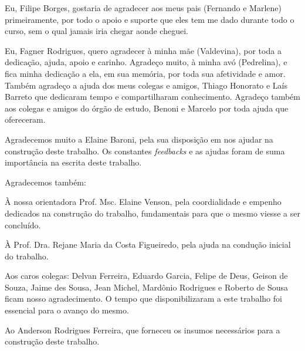 \begin{agradecimentos}
\begin{comment}
A inclusão desta seção de agradecimentos é opcional, portanto, sua inclusão 
fica a critério do(s) autor(es), que caso deseje(em) fazê-lo deverá(ão) 
utilizar este espaço, seguindo a formatação de \textit{espaço simples e 
fonte padrão do texto (arial ou times, tamanho 12 sem negritos, aspas ou 
itálico}.
\end{comment}

Eu, Filipe Borges, gostaria de agradecer aos meus pais (Fernando e Marlene) primeiramente, por todo o apoio e suporte que eles tem me dado durante todo o curso, sem o qual jamais iria chegar aonde cheguei.

Eu, Fagner Rodrigues, quero agradecer à minha mãe (Valdevina), por toda a dedicação, ajuda, apoio e carinho. Agradeço muito, à minha avó (Pedrelina), e fica minha dedicação a ela, em sua memória, por toda sua afetividade e amor. Também agradeço a ajuda dos meus colegas e amigos, Thiago Honorato e Laís Barreto que dedicaram tempo e compartilharam conhecimento. Agradeço também aos colegas e amigos do órgão de estudo, Benoni e Marcelo por toda ajuda que ofereceram.

Agradecemos muito a Elaine Baroni, pela sua disposição em nos ajudar na construção deste trabalho. Os constantes \textit{feedbacks} e as ajudas foram de suma importância na escrita deste trabalho.

Agradecemos também:

À nossa orientadora Prof. Msc. Elaine Venson, pela coordialidade e empenho dedicados na construção do trabalho, fundamentais para que o mesmo viesse a ser concluído.

À Prof. Dra. Rejane Maria da Costa Figueiredo, pela ajuda na condução inicial do trabalho.

Aos caros colegas: Delvan Ferreira, Eduardo Garcia, Felipe de Deus, Geison de Souza, Jaime des Sousa, Jean Michel, Mardônio Rodrigues e Roberto de Sousa ficam nosso agradecimento. O tempo que disponibilizaram a este trabalho foi essencial para o avanço do mesmo.

Ao Anderson Rodrigues Ferreira, que forneceu os insumos necessários para a construção deste trabalho.

\end{agradecimentos}
